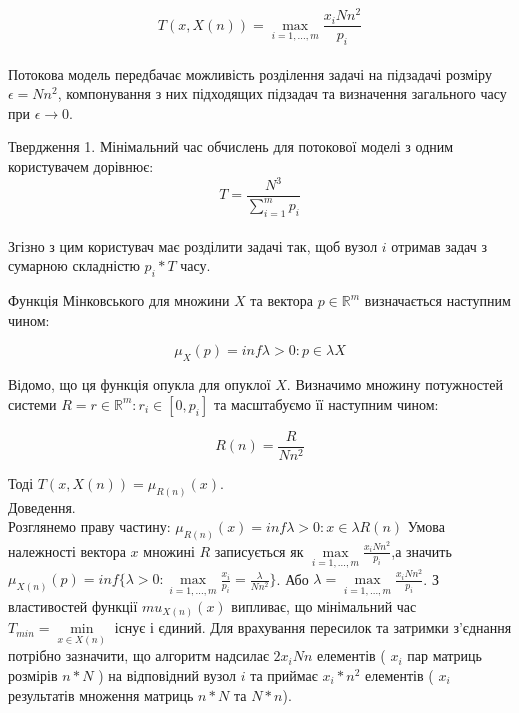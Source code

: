 \begin{equation}
	\label{eq:total_time_general}
	T(x,X(n)) = \max\limits_{i=1,\ldots,m}{\frac{x_i N n^2}{p_i}}
\end{equation}
\\
Потокова модель передбачає можливість розділення задачі на підзадачі розміру $\epsilon = N n^2$, компонування з них підходящих підзадач та визначення загального часу при  $\epsilon \longrightarrow 0$.

Твердження 1.
Мінімальний час обчислень для потокової моделі з одним користувачем дорівнює:
\begin{equation}
	\label{eq:lema1}
	T = \frac{N^{3}}{\sum_{i=1}^{m}p_i}
\end{equation}
\\
Згізно з цим користувач має розділити задачі так, щоб вузол $i$ отримав задач з сумарною складністю $p_i*T$ часу.

Функція Мінковського для множини $X$ та вектора $p \in \mathbb{R}^m$ визначається наступним чином:

\begin{equation}
	\mu_X(p) = inf {\lambda > 0 : p \in \lambda X}
\end{equation}

Відомо, що ця функція опукла для опуклої $X$.
Визначимо множину потужностей системи $R = {r \in \mathbb{R}^m : r_i \in [0, p_i]}$ та масштабуємо її наступним чином:

\begin{equation}
	R(n) = \frac{R}{Nn^2}
\end{equation}

Тоді $ T(x, X(n)) = \mu_{R(n)}(x) $.
\\
Доведення.
\\
Розглянемо праву частину: $\mu_{R(n)}(x) = inf {\lambda > 0 : x \in \lambda R(n)}$ Умова належності вектора $x$ множині $R$ записується як $\max\limits_{i=1,\ldots,m} \frac{x_i Nn^2}{p_i}$,а значить $\mu_{X(n)}(p) = inf \big\{ \lambda > 0 : \max\limits_{i=1,\ldots,m} \frac{x_i}{p_i} = \frac{\lambda}{Nn^2} \big\}$. Або $\lambda = \max\limits_{i=1,\ldots,m} \frac{x_i Nn^2}{p_i}$. З властивостей функції $mu_{X(n)}(x)$ випливає, що мінімальний час $T_{min} = \min\limits_{x \in X(n)} $ існує і єдиний. Для врахування пересилок та затримки з'єднання потрібно зазначити, що алгоритм надсилає $2x_iNn$ елементів ( $x_i$ пар матриць розмірів $n*N$ ) на відповідний вузол $i$ та приймає $x_i*n^2$ елементів ( $x_i$ результатів множення матриць $n*N$ та $N*n$).

